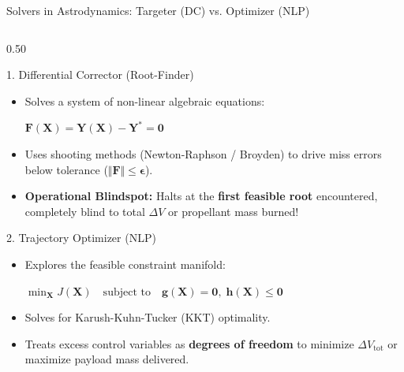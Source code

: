 \documentclass[aspectratio=169, 10pt]{beamer}
\begin{document}
\begin{frame}{Solvers in Astrodynamics: Targeter (DC) vs. Optimizer (NLP)}
    \begin{columns}[t]
        \begin{column}{0.50\textwidth}
            \begin{block}{1. Differential Corrector (Root-Finder)}
                \scriptsize
                \begin{itemize}\setlength{\itemsep}{1.2pt}
                    \item Solves a system of non-linear algebraic equations:
                    \par\vspace{1pt}
                    {\centering $\mathbf{F}(\mathbf{X}) = \mathbf{Y}(\mathbf{X}) - \mathbf{Y}^* = \mathbf{0}$\par}
                    \item Uses shooting methods (Newton-Raphson / Broyden) to drive miss errors below tolerance ($\Vert{}\mathbf{F}\Vert{} \le \boldsymbol{\epsilon}$).
                    \item \textbf{Operational Blindspot:} Halts at the \textbf{first feasible root} encountered, completely blind to total $\Delta V$ or propellant mass burned!
                \end{itemize}
            \end{block}

            \vspace{-0.08cm}

            \begin{block}{2. Trajectory Optimizer (NLP)}
                \scriptsize
                \begin{itemize}\setlength{\itemsep}{1.2pt}
                    \item Explores the feasible constraint manifold:
                    \par\vspace{1pt}
                    {\centering $\min_{\mathbf{X}} J(\mathbf{X}) \quad \text{subject to} \quad \mathbf{g}(\mathbf{X}) = \mathbf{0}, \; \mathbf{h}(\mathbf{X}) \le \mathbf{0}$\par}
                    \item Solves for Karush-Kuhn-Tucker (KKT) optimality.
                    \item Treats excess control variables as \textbf{degrees of freedom} to minimize $\Delta V_{\text{tot}}$ or maximize payload mass delivered.
                \end{itemize}
            \end{block}
        \end{column}


\end{columns}
\end{frame}
\end{document}

